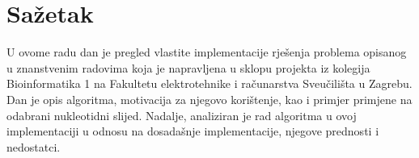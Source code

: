 \documentclass[times, utf8, seminar, numeric]{fer}
\begin{document}
\chapter{Sažetak}

U ovome radu dan je pregled vlastite implementacije rješenja problema opisanog u znanstvenim radovima koja je napravljena u sklopu projekta iz kolegija Bioinformatika 1 na Fakultetu elektrotehnike i računarstva Sveučilišta u Zagrebu. Dan je opis algoritma, motivacija za njegovo korištenje, kao i primjer primjene na odabrani nukleotidni slijed. Nadalje, analiziran je rad algoritma u ovoj implementaciji u odnosu na dosadašnje implementacije, njegove prednosti i nedostatci. \\
\end{document}

